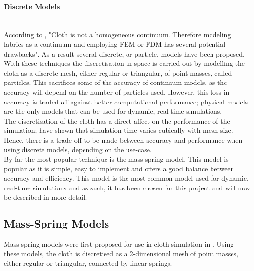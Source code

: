 \paragraph{Discrete Models}\leavevmode\\
According to \textcite[2]{Choi2002}, "Cloth is not a homogeneous continuum. Therefore modeling fabrics as a continuum and employing FEM or FDM has several potential drawbacks". As a result several discrete, or particle, models have been proposed.
\\With these techniques the discretisation in space is carried out by modelling the cloth as a discrete mesh, either regular or triangular, of point masses, called particles. This sacrifices some of the accuracy of continuum models, as the accuracy will depend on the number of particles used. However, this loss in accuracy is traded off against better computational performance; physical models are the only models that can be used for dynamic, real-time simulations.
\\The discretisation of the cloth has a direct affect on the performance of the simulation; \textcite[5]{Volino2001} have shown that simulation time varies cubically with mesh size. Hence, there is a trade off to be made between accuracy and performance when using discrete models, depending on the use-case.
\\By far the most popular technique is the mass-spring model. This model is popular as it is simple, easy to implement and offers a good balance between accuracy and efficiency. This model is the most common model used for dynamic, real-time simulations and as such, it has been chosen for this project and will now be described in more detail.

\subsection{Mass-Spring Models}
Mass-spring models were first proposed for use in cloth simulation in \textcite{Provot2001}. Using these models, the cloth is discretised as a 2-dimensional mesh of point masses, either regular or triangular, connected by linear springs.

